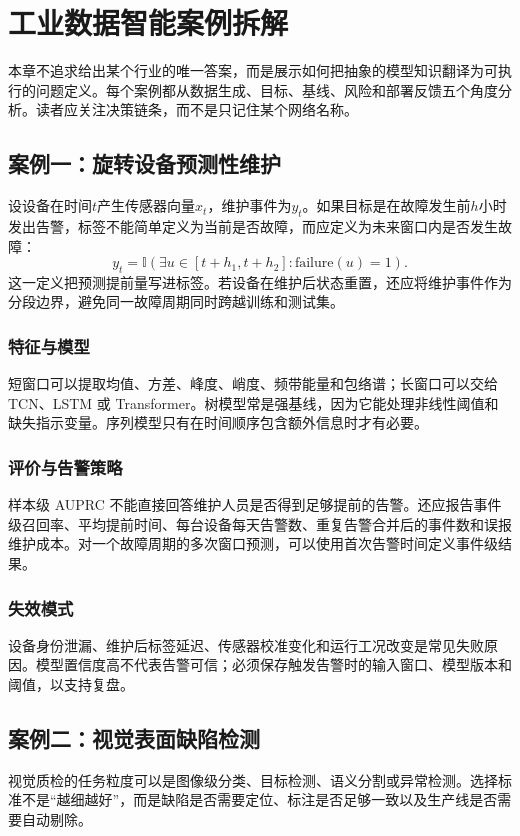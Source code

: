 \chapter{工业数据智能案例拆解}

本章不追求给出某个行业的唯一答案，而是展示如何把抽象的模型知识翻译为可执行的问题定义。每个案例都从数据生成、目标、基线、风险和部署反馈五个角度分析。读者应关注决策链条，而不是只记住某个网络名称。

\section{案例一：旋转设备预测性维护}
设设备在时间$t$产生传感器向量$x_t$，维护事件为$y_t$。如果目标是在故障发生前$h$小时发出告警，标签不能简单定义为当前是否故障，而应定义为未来窗口内是否发生故障：
\begin{equation}
 y_t=\mathbb{I}\left(\exists u\in[t+h_1,t+h_2]:\text{failure}(u)=1\right).
\end{equation}
这一定义把预测提前量写进标签。若设备在维护后状态重置，还应将维护事件作为分段边界，避免同一故障周期同时跨越训练和测试集。

\subsection{特征与模型}
短窗口可以提取均值、方差、峰度、峭度、频带能量和包络谱；长窗口可以交给 TCN、LSTM 或 Transformer。树模型常是强基线，因为它能处理非线性阈值和缺失指示变量。序列模型只有在时间顺序包含额外信息时才有必要。

\subsection{评价与告警策略}
样本级 AUPRC 不能直接回答维护人员是否得到足够提前的告警。还应报告事件级召回率、平均提前时间、每台设备每天告警数、重复告警合并后的事件数和误报维护成本。对一个故障周期的多次窗口预测，可以使用首次告警时间定义事件级结果。

\subsection{失效模式}
设备身份泄漏、维护后标签延迟、传感器校准变化和运行工况改变是常见失败原因。模型置信度高不代表告警可信；必须保存触发告警时的输入窗口、模型版本和阈值，以支持复盘。

\section{案例二：视觉表面缺陷检测}
视觉质检的任务粒度可以是图像级分类、目标检测、语义分割或异常检测。选择标准不是“越细越好”，而是缺陷是否需要定位、标注是否足够一致以及生产线是否需要自动剔除。


